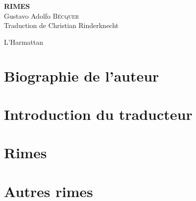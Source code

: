 \documentclass[a4paper,fontsize=13pt,twoside,final]{scrbook}
\begin{document}
\thispagestyle{empty}

\vspace*{70mm}

\begin{center}
{\Huge\textbf{RIMES}} \\
\bigskip
{\Large Gustavo Adolfo \textsc{Bécquer}} \\
\bigskip
Traduction de Christian Rinderknecht
\end{center}

\bigskip\bigskip\bigskip

\vfill
\begin{center}
L'Harmattan
\end{center}

\cleardoublepage

\frenchspacing  %

\part{Biographie de l'auteur}


\part{Introduction du traducteur}


\part{Rimes}


\part{Autres rimes}


\bigskip

\tableofcontents
\end{document}
